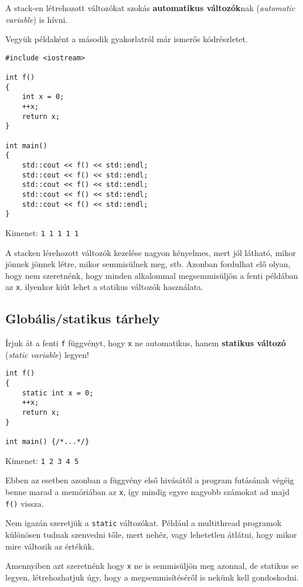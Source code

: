 \documentclass[a4paper,11.5pt,table]{article}
\begin{document}
	A stack-en létrehozott változókat szokás \textbf{automatikus változók}nak (\textit{automatic variable}) is hívni.
	
	\smallskip
	Vegyük példaként a második gyakorlatról már ismerős kódrészletet.
	
	\begin{lstlisting}
#include <iostream>

int f()
{
	int x = 0;
	++x;
	return x;
}

int main()
{
	std::cout << f() << std::endl;
	std::cout << f() << std::endl;
	std::cout << f() << std::endl;
	std::cout << f() << std::endl;
	std::cout << f() << std::endl;
}
	\end{lstlisting}
	Kimenet: \texttt{1 1 1 1 1}
	\smallskip
	
	A stacken lérehozott változók kezelése nagyon kényelmes, mert jól látható, mikor jönnek jönnek létre, mikor semmisülnek meg, stb. Azonban fordulhat elő olyan, hogy nem szeretnénk, hogy minden alkalommal megsemmisüljön a fenti példában az \texttt{x}, ilyenkor kiút lehet a statikus változók használata.
	\subsection{Globális/statikus tárhely}
	Írjuk át a fenti \texttt{f} függvényt, hogy \texttt{x} ne automatikus, hanem \textbf{statikus változó} (\textit{static variable}) legyen!
	\begin{lstlisting}
int f()
{
	static int x = 0;
	++x;
	return x;
}

int main() {/*...*/}
	\end{lstlisting}
	Kimenet: \texttt{1 2 3 4 5}
	
	Ebben az esetben azonban a függvény első hivásától a program futásának végéig benne marad a memóriában az \texttt{x}, így mindig egyre nagyobb számokat ad majd \texttt{f()} vissza.
	\begin{note}
		Nem igazán szeretjük a \texttt{static} változókat. Például a multithread programok különösen tudnak szenvedni tőle, mert nehéz, vagy lehetetlen átlátni, hogy mikor mire változik az értékük.
	\end{note}
	Amennyiben azt szeretnénk hogy \texttt{x} ne is semmisüljön meg azonnal, de statikus se legyen, létrehozhatjuk úgy, hogy a megsemmisítéséről is nekünk kell gondoskodni.
\end{document}

